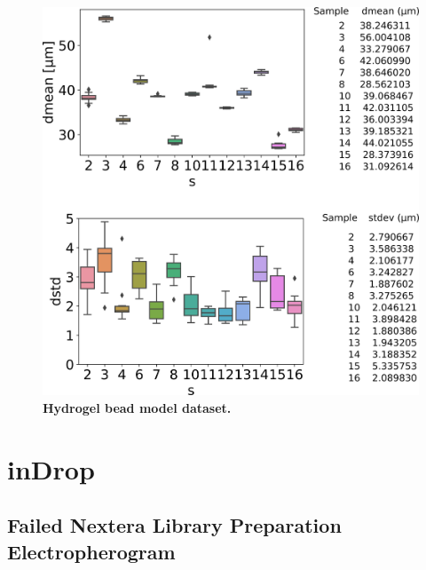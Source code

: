 \begin{appendix}
\clearpage
\begin{figure}[ht]
\centerfloat
\includegraphics[width=\textwidth]{./ims/indrop_beaddata.png}
\caption[Hydrogel bead model dataset]{\textbf{Hydrogel bead model dataset.}}
\label{fig:indrop_model_data}
\end{figure}

\clearpage
\section{inDrop}



\subsection{Failed Nextera Library Preparation Electropherogram}
\label{app:supp_nextera}


\end{appendix}
